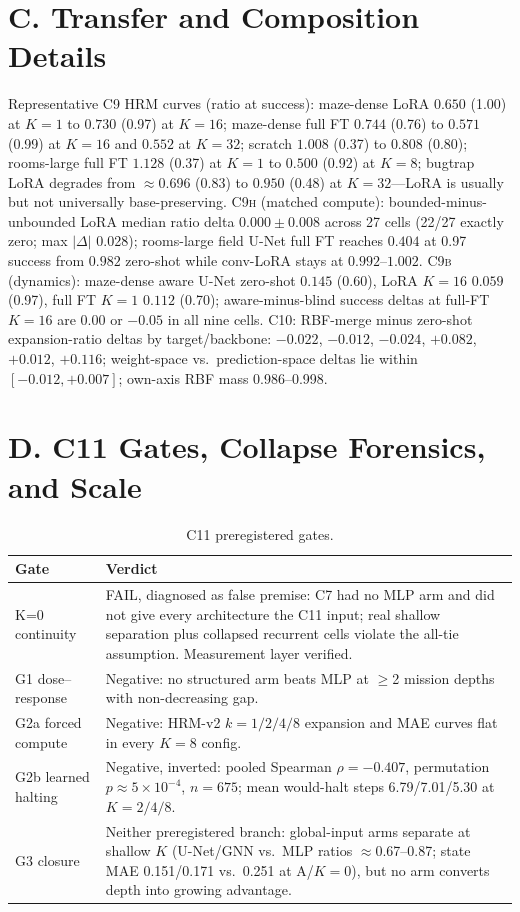 \documentclass[letterpaper]{article} %
\newcommand{\stage}[1]{\textsc{#1}}
\begin{document}
\section{C. Transfer and Composition Details}

Representative \stage{C9} HRM curves (ratio at success): maze-dense LoRA $0.650$ (1.00) at $K{=}1$ to $0.730$ (0.97) at $K{=}16$; maze-dense full FT $0.744$ (0.76) to $0.571$ (0.99) at $K{=}16$ and $0.552$ at $K{=}32$; scratch $1.008$ (0.37) to $0.808$ (0.80); rooms-large full FT $1.128$ (0.37) at $K{=}1$ to $0.500$ (0.92) at $K{=}8$; bugtrap LoRA degrades from $\approx$0.696 (0.83) to $0.950$ (0.48) at $K{=}32$---LoRA is usually but not universally base-preserving. \stage{C9h} (matched compute): bounded-minus-unbounded LoRA median ratio delta $0.000\pm0.008$ across 27 cells (22/27 exactly zero; max $|\Delta|$ 0.028); rooms-large field U-Net full FT reaches $0.404$ at 0.97 success from $0.982$ zero-shot while conv-LoRA stays at $0.992$--$1.002$. \stage{C9b} (dynamics): maze-dense aware U-Net zero-shot $0.145$ (0.60), LoRA $K{=}16$ $0.059$ (0.97), full FT $K{=}1$ $0.112$ (0.70); aware-minus-blind success deltas at full-FT $K{=}16$ are $0.00$ or $-0.05$ in all nine cells. \stage{C10}: RBF-merge minus zero-shot expansion-ratio deltas by target/backbone: $-0.022$, $-0.012$, $-0.024$, $+0.082$, $+0.012$, $+0.116$; weight-space vs.\ prediction-space deltas lie within $[-0.012, +0.007]$; own-axis RBF mass 0.986--0.998.

\section{D. \stage{C11} Gates, Collapse Forensics, and Scale}

\begin{table}[h]
\centering
\footnotesize
\begin{tabular}{@{}lp{5.2cm}@{}}
\toprule
Gate & Verdict \\
\midrule
K=0 continuity & FAIL, diagnosed as false premise: \stage{C7} had no MLP arm and did not give every architecture the \stage{C11} input; real shallow separation plus collapsed recurrent cells violate the all-tie assumption. Measurement layer verified. \\
G1 dose--response & Negative: no structured arm beats MLP at $\geq$2 mission depths with non-decreasing gap. \\
G2a forced compute & Negative: HRM-v2 $k{=}1/2/4/8$ expansion and MAE curves flat in every $K{=}8$ config. \\
G2b learned halting & Negative, inverted: pooled Spearman $\rho{=}-0.407$, permutation $p{\approx}5{\times}10^{-4}$, $n{=}675$; mean would-halt steps 6.79/7.01/5.30 at $K{=}2/4/8$. \\
G3 closure & Neither preregistered branch: global-input arms separate at shallow $K$ (U-Net/GNN vs.\ MLP ratios $\approx$0.67--0.87; state MAE 0.151/0.171 vs.\ 0.251 at A/$K{=}0$), but no arm converts depth into growing advantage. \\
\bottomrule
\end{tabular}
\caption{\stage{C11} preregistered gates.}
\label{tab:c11gates}
\end{table}
\end{document}
